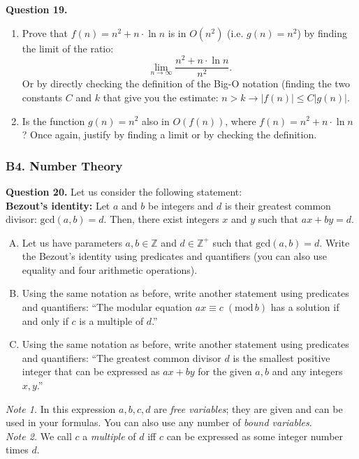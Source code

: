 \documentclass[jou]{apa6}
\begin{document}
\vspace{6pt}
{\bf Question 19.} 
\begin{enumerate}
\item 
Prove that $f(n) = n^2 + n \cdot \ln n$ is in $O(n^2)$ (i.e. $g(n) = n^2$) by finding the limit
of the ratio:
$$\lim_{n \rightarrow \infty} \frac{n^2 + n \cdot \ln n}{n^2}.$$
Or by directly checking the definition of the Big-O notation (finding the two 
constants $C$ and $k$ that give you the estimate: 
$n>k \rightarrow |f(n)| \leq C|g(n)|$.
\item Is the function $g(n) = n^2$ also in $O(f(n))$, where $f(n) = n^2 + n \cdot \ln n$? 
Once again, justify by finding a limit or by checking the definition.
\end{enumerate}





\subsubsection{B4. Number Theory} 


{\bf Question 20.} Let us consider the following statement:\\

{\bf Bezout's identity:} 
Let $a$ and $b$ be integers and $d$ is their greatest common divisor: $\text{gcd}(a,b)=d$. 
Then, there exist integers $x$ and $y$ such that $ax + by = d$.\\

\begin{enumerate}[(A)] 
\item Let us have parameters $a,b \in \mathbb{Z}$ and $d \in \mathbb{Z}^{+}$ such that $\text{gcd}(a,b)=d$. 
Write the Bezout's identity using predicates and quantifiers (you can also 
use equality and four arithmetic operations). 
\item Using the same notation as before, write another statement using predicates and quantifiers: 
``The modular equation $ax\equiv{}c\;(\text{mod}\,b)$ has a solution if and only if 
$c$ is a multiple of $d$.''
\item Using the same notation as before, write another statement using predicates and quantifiers: 
``The greatest common divisor $d$ is the smallest positive integer that can be expressed as $ax+by$ for 
the given $a,b$ and any integers $x,y$.''
\end{enumerate}

{\em Note 1.} In this expression $a,b,c,d$ are {\em free variables}; they are given and can be used in your formulas. 
You can also use any number of {\em bound variables}.\\
{\em Note 2.} We call $c$ a {\em multiple} of $d$ iff $c$ can be expressed as some integer number times $d$.
\end{document}

